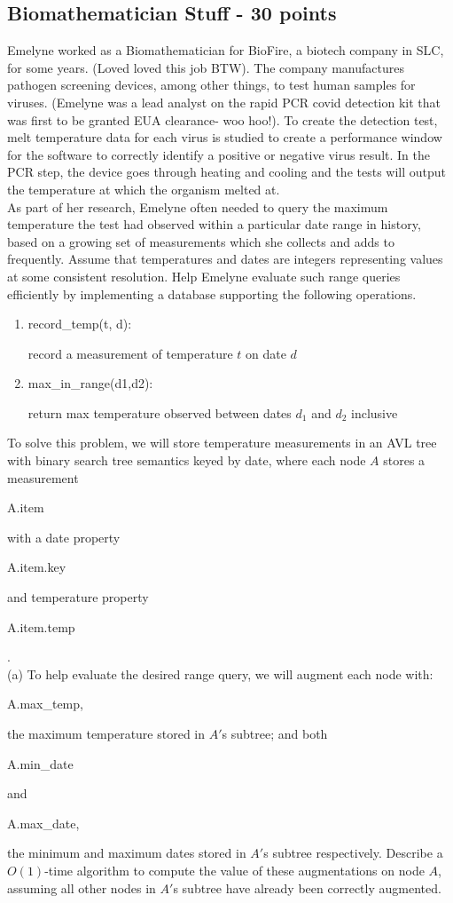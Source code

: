 \documentclass[12pt]{amsart}
\begin{document}
\subsection{Biomathematician Stuff - 30 points}
Emelyne worked as a Biomathematician for BioFire, a biotech company in SLC, for some years. (Loved loved this job BTW). The company manufactures pathogen screening devices, among other things, to test human samples for viruses. (Emelyne was a lead analyst on the rapid PCR covid detection kit that was first to be granted EUA clearance- woo hoo!). To create the detection test, melt temperature data for each virus is studied to create a performance window for the software to correctly identify a positive or negative virus result. In the PCR step, the device goes through heating and cooling and the tests will output the temperature at which the organism melted at. 
\\
As part of her research, Emelyne often needed to query the maximum temperature the test had observed within a particular date range in history, based on a growing set of measurements which she collects and adds to frequently. Assume that temperatures and dates are integers representing values at some consistent resolution. Help Emelyne evaluate such range queries efficiently by implementing a database supporting the following operations. 
\begin{enumerate}
\item \begin{tt} record\_temp(t, d):\end{tt} record a measurement of temperature $t$ on date $d$
\item  \begin{tt} max\_in\_range(d1,d2):\end{tt} return max temperature observed between dates $d_1$ and $d_2$ inclusive 
\end{enumerate}
To solve this problem, we will store temperature measurements in an AVL tree with binary search
tree semantics keyed by date, where each node $A$ stores a measurement \begin{tt} A.item \end{tt} with a date property \begin{tt} A.item.key \end{tt} and temperature property \begin{tt} A.item.temp \end{tt}. 
\\

(a) To help evaluate the desired range query, we will augment each node with: \begin{tt} A.max\_temp,\end{tt} the maximum temperature stored in $A'$s subtree; and both \begin{tt} A.min\_date \end{tt}
and \begin{tt} A.max\_date,\end{tt} the minimum and maximum dates stored in $A'$s subtree respectively. Describe a $O(1)$-time algorithm to compute the value of these augmentations on node $A$, assuming all other nodes in $A'$s subtree have already been correctly augmented. 
\\
\end{document}
